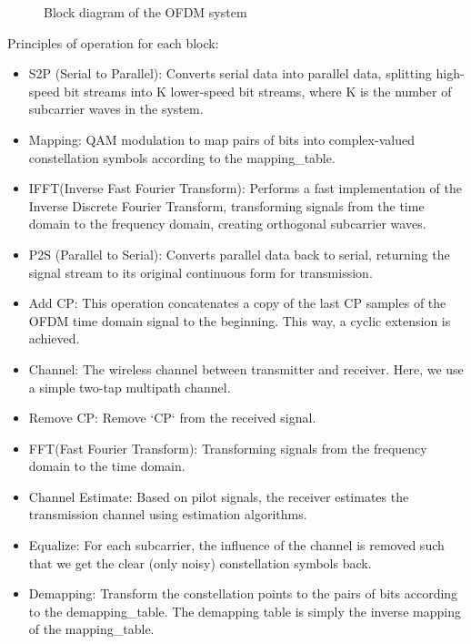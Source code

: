 \begin{figure}[htbp]
    \centering
    
    \caption{Block diagram of the OFDM system}
    \label{diagram}
\end{figure}

Principles of operation for each block:
\begin{itemize}
    \item S2P (Serial to Parallel): Converts serial data into parallel data, splitting high-speed bit streams into K lower-speed bit streams, where K is the number of subcarrier waves in the system.
    \item Mapping: QAM modulation to map pairs of bits into complex-valued constellation symbols according to the mapping\_table.
    \item IFFT(Inverse Fast Fourier Transform): Performs a fast implementation of the Inverse Discrete Fourier Transform, transforming signals from the time domain to the frequency domain, creating orthogonal subcarrier waves.
    \item P2S (Parallel to Serial): Converts parallel data back to serial, returning the signal stream to its original continuous form for transmission.
    \item Add CP:  This operation concatenates a copy of the last CP samples of the OFDM time domain signal to the beginning. This way, a cyclic extension is achieved.
    \item Channel: The wireless channel between transmitter and receiver. Here, we use a simple two-tap multipath channel.
    \item Remove CP: Remove `CP` from the received signal.
    \item FFT(Fast Fourier Transform): Transforming signals from the frequency domain to the time domain.
    \item Channel Estimate: Based on pilot signals, the receiver estimates the transmission channel using estimation algorithms.
    \item Equalize: For each subcarrier, the influence of the channel is removed such that we get the clear (only noisy) constellation symbols back.
    \item Demapping: Transform the constellation points to the pairs of bits according to the demapping\_table. The demapping table is simply the inverse mapping of the mapping\_table.
\end{itemize}
